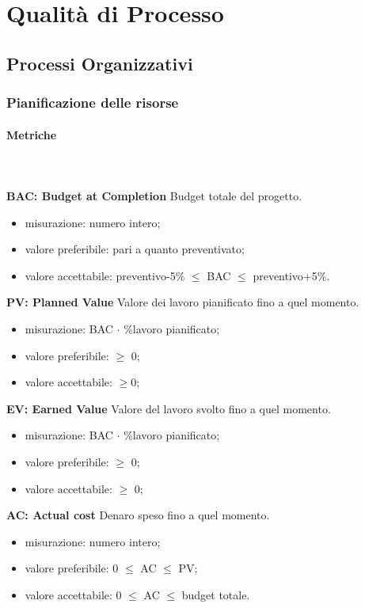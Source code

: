 \section{Qualità di Processo}
	\subsection{Processi Organizzativi}
		\subsubsection{Pianificazione delle risorse}
			\paragraph{Metriche} \mbox{} \\ \\
				\textbf{BAC: Budget at Completion} Budget totale del progetto\glo.
				\begin{itemize}
					\item misurazione: numero intero;
					\item valore preferibile: pari a quanto preventivato;
					\item valore accettabile: preventivo-5\% $\le$ BAC $\le$ preventivo+5\%.
				\end{itemize}
				\textbf{PV: Planned Value} Valore dei lavoro pianificato fino a quel momento.
				\begin{itemize}
					\item misurazione: BAC $\cdot$ \%lavoro pianificato;
					\item valore preferibile: $\ge$ 0;
					\item valore accettabile: $\ge$0;
				\end{itemize}
				\textbf{EV: Earned Value} Valore del lavoro svolto fino a quel momento.
				\begin{itemize}
					\item misurazione: BAC $\cdot$ \%lavoro pianificato;
					\item valore preferibile: $\ge$ 0;
					\item valore accettabile: $\ge$ 0;
				\end{itemize}
				\textbf{AC: Actual cost} Denaro speso fino a quel momento.
				\begin{itemize}
					\item misurazione: numero intero;
					\item valore preferibile: 0 $\le$ AC $\le$ PV;
					\item valore accettabile: 0 $\le$ AC $\le$ budget totale.
				\end{itemize}
